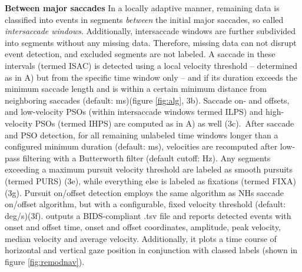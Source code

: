  \textbf{Between major saccades} In a locally adaptive manner, remaining data is classified into events in segments \textit{between} the initial major saccades, so called \textit{intersaccade windows}. Additionally, intersaccade windows are further subdivided into segments without any missing data. Therefore, missing data can not disrupt event detection, and excluded segments are not labeled. A saccade in these intervals (termed ISAC) is detected using a local velocity threshold -- determined as in A) but from the specific time window only -- and if its duration exceeds the minimum saccade length and is within a certain minimum distance from neighboring saccades (default: \unit[130]{ms})(figure \ref{fig:alg}, 3b). Saccade on- and offsets, and low-velocity PSOs (within intersaccade windows termed ILPS) and high-velocity PSOs (termed IHPS) are computed as in A) as well (3c).\
 After saccade and PSO detection, for all remaining unlabeled time windows longer than a configured minimum duration (default: \unit[40]{ms}), velocities are recomputed after low-pass filtering with a Butterworth filter (default cutoff: \unit[4]{Hz}). Any segments exceeding a maximum pursuit velocity threshold are labeled as smooth pursuits (termed PURS) (3e), while everything else is labeled as fixations (termed FIXA)(3g). Pursuit on/offset detection employs the same algorithm as NHs saccade on/offset algorithm, but with a configurable, fixed velocity threshold (default: \unit[2]{deg/s})(3f). \remodnav outputs a BIDS-compliant \citep{gorgolewski2016brain} .tsv file and reports detected events with onset and offset time, onset and offset coordinates, amplitude, peak velocity, median velocity and average velocity. Additionally, it plots a time course of horizontal and vertical gaze position in conjunction with classed labels (shown in figure \ref{fig:remodnav}).
   




